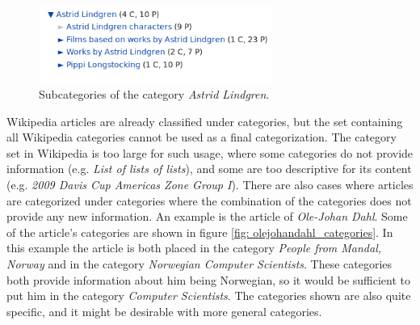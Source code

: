 
\begin{figure}[H]
\centering
\includegraphics[height=2.5cm]{Chapters/Background/Astrid_Lindgren}
\caption{Subcategories of the category \emph{Astrid Lindgren}. }
\label{fig: subcat_lindgren}
\end{figure}

Wikipedia articles are already classified under categories, but the set containing all Wikipedia categories cannot be used as a final categorization. The category set in Wikipedia is too large for such usage, where some categories do not provide information (e.g. \emph{List of lists of lists}), and some are too descriptive for its content (e.g. \emph{2009 Davis Cup Americas Zone Group I}). There are also cases where articles are categorized under categories where the combination of the categories does not provide any new information. An example is the article of \emph{Ole-Johan Dahl}. Some of the article's categories are shown in figure \ref{fig: olejohandahl_categories}. In this example the article is both placed in the category \emph{People from Mandal, Norway} and in the category \emph{Norwegian Computer Scientists}. These categories both provide information about him being Norwegian, so it would be sufficient to put him in the category \emph{Computer Scientists}. The categories shown are also quite specific, and it might be desirable with more general categories. 





